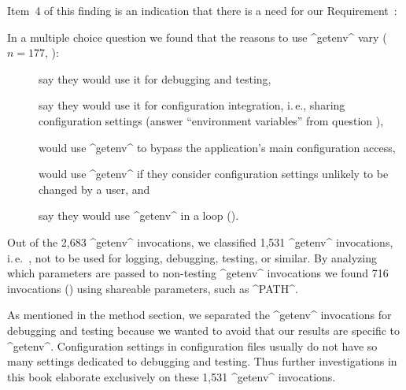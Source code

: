 Item~4 of this finding is an indication that there is a need for our Requirement~:
\reqSharing*


\methodQuestion{}
In a multiple choice question we found that the reasons to use ^getenv^ vary ($n=177$, ):
\begin{description}
\item[] say they would use it for debugging and testing,
\item[] say they would use it for configuration integration, i.\,e., sharing configuration settings (answer ``environment variables'' from question ),
\item[] would use ^getenv^ to bypass the application's main configuration access,
\item[] would use ^getenv^ if they consider configuration settings unlikely to be changed by a user, and
\item[] say they would use ^getenv^ in a loop ().
\end{description}

\methodSource{}
Out of the 2,683 ^getenv^ invocations, we classified 1,531 ^getenv^ invocations, i.\,e.\ , not to be used for logging, debugging, testing, or similar.
By analyzing which parameters are passed to non-testing ^getenv^ invocations we found 716 invocations () using shareable parameters, such as ^PATH^.

As mentioned in the method section, we separated the ^getenv^ invocations for debugging and testing because we wanted to avoid that our results are specific to ^getenv^.
Configuration settings in configuration files usually do not have so many settings dedicated to debugging and testing.
Thus further investigations in this book elaborate exclusively on these 1,531 ^getenv^ invocations.


